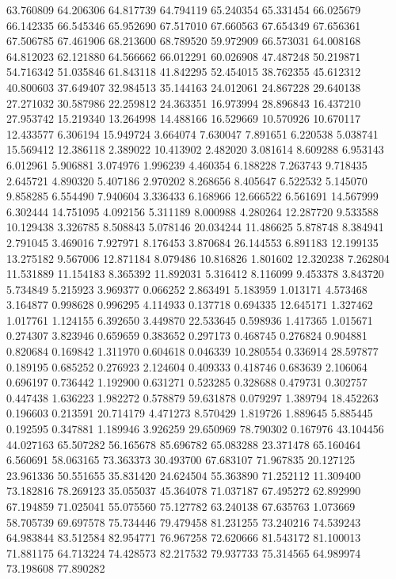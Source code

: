 63.760809
64.206306
64.817739
64.794119
65.240354
65.331454
66.025679
66.142335
66.545346
65.952690
67.517010
67.660563
67.654349
67.656361
67.506785
67.461906
68.213600
68.789520
59.972909
66.573031
64.008168
64.812023
62.121880
64.566662
66.012291
60.026908
47.487248
50.219871
54.716342
51.035846
61.843118
41.842295
52.454015
38.762355
45.612312
40.800603
37.649407
32.984513
35.144163
24.012061
24.867228
29.640138
27.271032
30.587986
22.259812
24.363351
16.973994
28.896843
16.437210
27.953742
15.219340
13.264998
14.488166
16.529669
10.570926
10.670117
12.433577
6.306194
15.949724
3.664074
7.630047
7.891651
6.220538
5.038741
15.569412
12.386118
2.389022
10.413902
2.482020
3.081614
8.609288
6.953143
6.012961
5.906881
3.074976
1.996239
4.460354
6.188228
7.263743
9.718435
2.645721
4.890320
5.407186
2.970202
8.268656
8.405647
6.522532
5.145070
9.858285
6.554490
7.940604
3.336433
6.168966
12.666522
6.561691
14.567999
6.302444
14.751095
4.092156
5.311189
8.000988
4.280264
12.287720
9.533588
10.129438
3.326785
8.508843
5.078146
20.034244
11.486625
5.878748
8.384941
2.791045
3.469016
7.927971
8.176453
3.870684
26.144553
6.891183
12.199135
13.275182
9.567006
12.871184
8.079486
10.816826
1.801602
12.320238
7.262804
11.531889
11.154183
8.365392
11.892031
5.316412
8.116099
9.453378
3.843720
5.734849
5.215923
3.969377
0.066252
2.863491
5.183959
1.013171
4.573468
3.164877
0.998628
0.996295
4.114933
0.137718
0.694335
12.645171
1.327462
1.017761
1.124155
6.392650
3.449870
22.533645
0.598936
1.417365
1.015671
0.274307
3.823946
0.659659
0.383652
0.297173
0.468745
0.276824
0.904881
0.820684
0.169842
1.311970
0.604618
0.046339
10.280554
0.336914
28.597877
0.189195
0.685252
0.276923
2.124604
0.409333
0.418746
0.683639
2.106064
0.696197
0.736442
1.192900
0.631271
0.523285
0.328688
0.479731
0.302757
0.447438
1.636223
1.982272
0.578879
59.631878
0.079297
1.389794
18.452263
0.196603
0.213591
20.714179
4.471273
8.570429
1.819726
1.889645
5.885445
0.192595
0.347881
1.189946
3.926259
29.650969
78.790302
0.167976
43.104456
44.027163
65.507282
56.165678
85.696782
65.083288
23.371478
65.160464
6.560691
58.063165
73.363373
30.493700
67.683107
71.967835
20.127125
23.961336
50.551655
35.831420
24.624504
55.363890
71.252112
11.309400
73.182816
78.269123
35.055037
45.364078
71.037187
67.495272
62.892990
67.194859
71.025041
55.075560
75.127782
63.240138
67.635763
1.073669
58.705739
69.697578
75.734446
79.479458
81.231255
73.240216
74.539243
64.983844
83.512584
82.954771
76.967258
72.620666
81.543172
81.100013
71.881175
64.713224
74.428573
82.217532
79.937733
75.314565
64.989974
73.198608
77.890282
